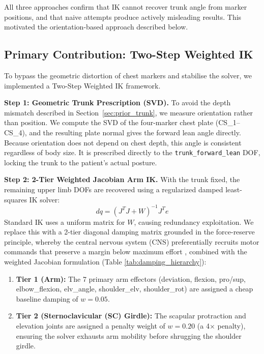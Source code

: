 \documentclass[12pt, a4paper]{elsarticle}
\begin{document}
All three approaches confirm that IK cannot recover trunk angle from marker positions, and that naive attempts produce actively misleading results. This motivated the orientation-based approach described below.

\subsection{Primary Contribution: Two-Step Weighted IK}
\label{sec:weighted}
To bypass the geometric distortion of chest markers and stabilise the solver, we implemented a Two-Step Weighted IK framework.

\textbf{Step 1: Geometric Trunk Prescription (SVD).} 
To avoid the depth mismatch described in Section~\ref{sec:prior_trunk}, we measure orientation rather than position. We compute the SVD of the four-marker chest plate (CS\_1–CS\_4), and the resulting plate normal gives the forward lean angle directly. Because orientation does not depend on chest depth, this angle is consistent regardless of body size. It is prescribed directly to the \texttt{trunk\_forward\_lean} DOF, locking the trunk to the patient's actual posture.

\textbf{Step 2: 2-Tier Weighted Jacobian Arm IK.}
With the trunk fixed, the remaining upper limb DOFs are recovered using a regularized damped least-squares IK solver:
\begin{equation}
\label{eq:dls}
dq = (J^T J + W)^{-1} J^T e
\end{equation}
Standard IK uses a uniform matrix for $W$, causing redundancy exploitation. We replace this with a 2-tier diagonal damping matrix grounded in the force-reserve principle, whereby the central nervous system (CNS) preferentially recruits motor commands that preserve a margin below maximum effort \cite{faity2024}, combined with the weighted Jacobian formulation \cite{khoramshahi2022} (Table \ref{tab:damping_hierarchy}):

\begin{enumerate}
    \item \textbf{Tier 1 (Arm):} The 7 primary arm effectors (deviation, flexion, pro/sup, elbow\_flexion, elv\_angle, shoulder\_elv, shoulder\_rot) are assigned a cheap baseline damping of $w=0.05$.
    \item \textbf{Tier 2 (Sternoclavicular (SC) Girdle):} The scapular protraction and elevation joints are assigned a penalty weight of $w=0.20$ (a 4× penalty), ensuring the solver exhausts arm mobility before shrugging the shoulder girdle.
\end{enumerate}
\end{document}
